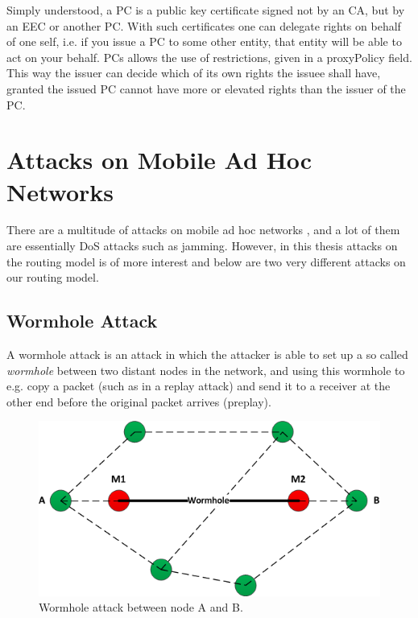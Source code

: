 Simply understood, a \ac{PC} is a public key certificate signed not
by an \ac{CA}, but by an \ac{EEC} or another \ac{PC}. With such certificates one
can delegate rights on behalf of one self, i.e. if you issue a \ac{PC} to some
other entity, that entity will be able to act on your behalf. \acp{PC} allows
the use of restrictions, given in a proxyPolicy field. This way the issuer can
decide which of its own rights the issuee shall have, granted the issued \ac{PC}
cannot have more or elevated rights than the issuer of the \ac{PC}.

\section{Attacks on Mobile Ad Hoc Networks}
There are a multitude of attacks on mobile ad hoc networks
\cite{goyal2010literature}, and a lot of them are essentially \ac{DoS} attacks
such as jamming. However, in this thesis attacks on the routing model is of
more interest and below are two very different attacks on our routing model.

\subsection{Wormhole Attack}
A wormhole attack is an attack in which the attacker is able to set up a so
called \emph{wormhole} between two distant nodes in the network, and using this
wormhole to e.g. copy a packet (such as in a replay attack) and send it to a
receiver at the other end before the original packet arrives (preplay).

\begin{figure}[h]
	\centering
  	\includegraphics[width=\textwidth]{images/wormhole_attack.png}
  	\caption{Wormhole attack between node A and B.}
	\label{fig:wormhole_attack}
\end{figure}

